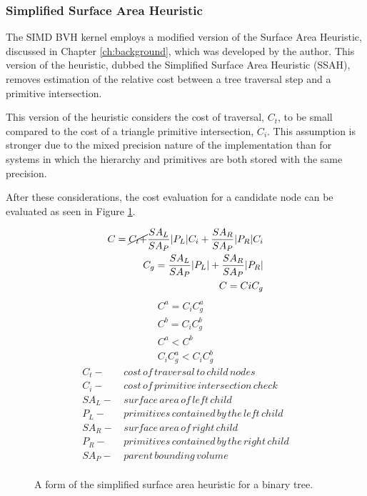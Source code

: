 \subsubsection{Simplified Surface Area Heuristic}

The SIMD BVH kernel employs a modified version of the Surface Area Heuristic,
discussed in Chapter \ref{ch:background}, which was developed by the
author. This version of the heuristic, dubbed the Simplified Surface Area
Heuristic (SSAH), removes estimation of the relative cost between a tree
traversal step and a primitive intersection.

This version of the heuristic considers the cost of traversal, $C_{t}$, to be
small compared to the cost of a triangle primitive intersection, $C_{i}$. This
assumption is stronger due to the mixed precision nature of the implementation
than for systems in which the hierarchy and primitives are both stored with the
same precision.

After these considerations, the cost evaluation for a candidate node can be
evaluated as seen in Figure \ref{fig:SSAH}.

\begin{figure}[H]
  \begin{align}
    C =  \cancel{C_{t} +} \frac{SA_{L}}{SA_{P}} |P_{L}|C_{i} + \frac{SA_{R}}{SA_{P}} |P_{R}|C_{i} \\
    C_{g} = \frac{SA_{L}}{SA_{P}} |P_{L}| +  \frac{SA_{R}}{SA_{P}}|P_{R}| \\
    C = C{i}C_{g}
  \end{align}
  \begin{align*}
    C^{a} = C_{i} C^{a}_{g} \\
    C^{b} = C_{i} C^{b}_{g} \\
    C^{a} < C^{b} \\
    C_{i}C^{a}_{g} < C_{i}C^{b}_{g}
  \end{align*}
  \begin{align*}
    C_{t} - & \,cost\, of\, traversal\, to\, child\, nodes \\
    C_{i} - & \, cost\, of\, primitive\, intersection\, check\, \\
    SA_{L} - &  \,surface\, area\, of\, left\, child \\
    P_{L} - & \, primitives\, contained\, by\, the\, left\, child  \\
    SA_{R} - & \, surface\, area\, of\, right\, child \\
    P_{R} - & \, primitives\, contained\, by\, the\, right\, child \\
    SA_{P} - & \, parent\, bounding\, volume \\
  \end{align*}
  \caption{A form of the simplified surface area heuristic for a binary tree.}
  \label{fig:SSAH}
\end{figure}

